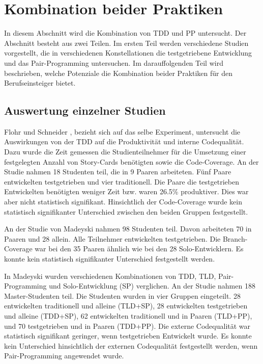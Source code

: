 
\section{Kombination beider Praktiken} \label{sec:TDD+PP}

In diesem Abschnitt wird die Kombination von TDD und PP untersucht. Der Abschnitt besteht aus zwei Teilen. Im ersten Teil werden verschiedene Studien vorgestellt, die in verschiedenen Konstellationen die testgetriebene Entwicklung und das Pair-Programming untersuchen. Im darauffolgenden Teil wird beschrieben, welche Potenziale die Kombination beider Praktiken für den Berufseinsteiger bietet.

\subsection{Auswertung einzelner Studien}

Flohr und Schneider \cite{Flohr2006LessonsTeachings}, \cite{Flohr2005AnProblems} bezieht sich auf das selbe Experiment, untersucht die Auswirkungen von der TDD auf die Produktivität und interne Codequalität. Dazu wurde die Zeit gemessen die Studienteilnehmer für die Umsetzung einer festgelegten Anzahl von Story-Cards benötigten sowie die Code-Coverage. An der Studie nahmen 18 Studenten teil, die in 9 Paaren arbeiteten. Fünf Paare entwickelten testgetrieben und vier traditionell. Die Paare die testgetrieben Entwickelten benötigten weniger Zeit bzw. waren 26.5\% produktiver. Dies war aber nicht statistisch signifikant. Hinsichtlich der Code-Coverage wurde kein statistisch signifikanter Unterschied zwischen den beiden Gruppen festgestellt.

An der Studie von Madeyski \cite{Madeyski2007OnTests} nahmen 98 Studenten teil. Davon arbeiteten 70 in Paaren und 28 allein. Alle Teilnehmer entwickelten testgetrieben. Die Branch-Coverage war bei den 35 Paaren ähnlich wie bei den 28 Solo-Entwicklern. Es konnte kein statistisch signifikanter Unterschied festgestellt werden.

In Madeyski \cite{Madeyski2005PreliminaryQuality} wurden verschiedenen Kombinationen von TDD, TLD, Pair-Programming und Solo-Entwicklung (SP) verglichen. An der Studie nahmen 188 Master-Studenten teil. Die Studenten wurden in vier Gruppen eingeteilt. 28 entwickelten traditionell und alleine (TLD+SP), 28 entwickelten testgetrieben und alleine (TDD+SP), 62 entwickelten traditionell und in Paaren (TLD+PP), und 70 testgetrieben und in Paaren (TDD+PP). Die externe Codequalität war statistisch signifikant geringer, wenn testgetrieben Entwickelt wurde. Es konnte kein Unterschied hinsichtlich der externen Codequalität festgestellt werden, wenn Pair-Programming angewendet wurde.

